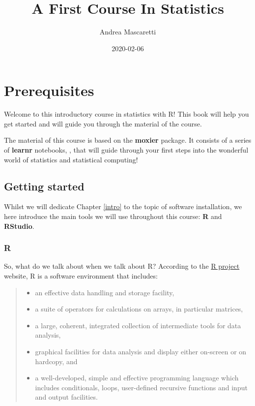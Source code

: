 \documentclass[]{book}
\title{A First Course In Statistics}
\author{Andrea Mascaretti}
\date{2020-02-06}
\providecommand{\tightlist}{%
  \setlength{\itemsep}{0pt}\setlength{\parskip}{0pt}}
\begin{document}
\maketitle

{
\setcounter{tocdepth}{1}
\tableofcontents
}
\chapter{Prerequisites}\label{prerequisites}

Welcome to this introductory course in statistics with R! This book will
help you get started and will guide you through the material of the
course.

The material of this course is based on the \textbf{moxier} package. It
consists of a series of \textbf{learnr} notebooks, \citep{R-learnr},
that will guide through your first steps into the wonderful world of
statistics and statistical computing!

\section{Getting started}\label{getting-started}

Whilst we will dedicate Chapter \ref{intro} to the topic of software
installation, we here introduce the main tools we will use throughout
this course: \textbf{R} and \textbf{RStudio}.

\subsection{R}\label{r}

So, what do we talk about when we talk about R? According to the
\href{https://www.r-project.org/about.html}{R project} website, R is a
software environment that includes:

\begin{quote}
\begin{itemize}
\tightlist
\item
  an effective data handling and storage facility,
\item
  a suite of operators for calculations on arrays, in particular
  matrices,
\item
  a large, coherent, integrated collection of intermediate tools for
  data analysis,
\item
  graphical facilities for data analysis and display either on-screen or
  on hardcopy, and
\item
  a well-developed, simple and effective programming language which
  includes conditionals, loops, user-defined recursive functions and
  input and output facilities.
\end{itemize}
\end{quote}
\end{document}
